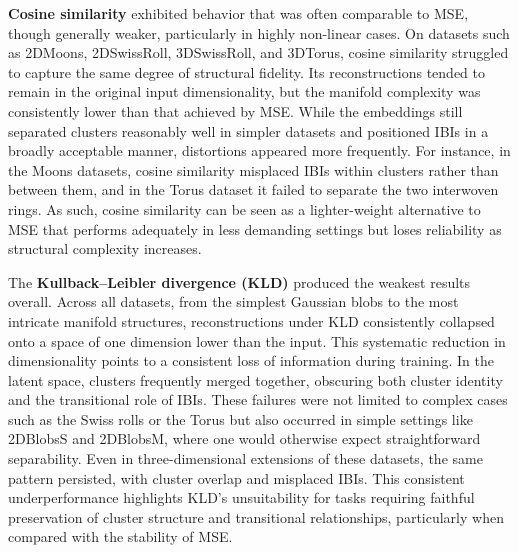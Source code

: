 \textbf{Cosine similarity} exhibited behavior that was often comparable to MSE, though generally weaker, particularly in highly non-linear cases. On datasets such as 2DMoons, 2DSwissRoll, 3DSwissRoll, and 3DTorus, cosine similarity struggled to capture the same degree of structural fidelity. Its reconstructions tended to remain in the original input dimensionality, but the manifold complexity was consistently lower than that achieved by MSE. While the embeddings still separated clusters reasonably well in simpler datasets and positioned IBIs in a broadly acceptable manner, distortions appeared more frequently. For instance, in the Moons datasets, cosine similarity misplaced IBIs within clusters rather than between them, and in the Torus dataset it failed to separate the two interwoven rings. As such, cosine similarity can be seen as a lighter-weight alternative to MSE that performs adequately in less demanding settings but loses reliability as structural complexity increases.

The \textbf{Kullback–Leibler divergence (KLD)} produced the weakest results overall. Across all datasets, from the simplest Gaussian blobs to the most intricate manifold structures, reconstructions under KLD consistently collapsed onto a space of one dimension lower than the input. This systematic reduction in dimensionality points to a consistent loss of information during training. In the latent space, clusters frequently merged together, obscuring both cluster identity and the transitional role of IBIs. These failures were not limited to complex cases such as the Swiss rolls or the Torus but also occurred in simple settings like 2DBlobsS and 2DBlobsM, where one would otherwise expect straightforward separability. Even in three-dimensional extensions of these datasets, the same pattern persisted, with cluster overlap and misplaced IBIs. This consistent underperformance highlights KLD’s unsuitability for tasks requiring faithful preservation of cluster structure and transitional relationships, particularly when compared with the stability of MSE.

